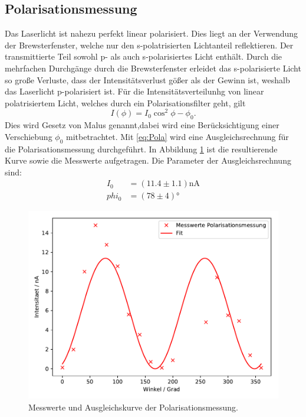 \subsection{Polarisationsmessung}
Das Laserlicht ist nahezu perfekt linear polarisiert. Dies liegt an der Verwendung der
Brewsterfenster, welche nur den s-polatrisierten Lichtanteil reflektieren. Der
transmittierte Teil sowohl p- als auch s-polarisiertes Licht enthält. Durch die
mehrfachen Durchgänge durch die Brewsterfenster erleidet das s-polarisierte Licht
so große Verluste, dass der Intensitätsverlust gößer als der Gewinn ist, weshalb
das Laserlicht p-polarisiert ist.
Für die Intensitätsverteilunhg von linear polatrisiertem Licht, welches durch ein
Polarisationsfilter geht, gilt
\begin{equation}
  I(\phi)=I_0 \cos^2{\phi-\phi_0} .
\end{equation}
Dies wird Gesetz von Malus genannt,dabei wird eine Berücksichtigung einer Verschiebung $\phi_0$
mitbetrachtet.
Mit \ref{eq:Pola} wird eine Ausgleichsrechnung für die Polarisationsmessung durchgeführt.
In Abbildung \ref{fig:Pola} ist die resultierende Kurve sowie die Messwerte aufgetragen.
Die Parameter der Ausgleichsrechnung sind:
\begin{align*}
  I_0&=(11.4 \pm 1.1)\text{nA} \\
  phi_0&=(78 \pm 4)°
\end{align*}
\begin{figure}[H]
  \centering
  \includegraphics{plots/Polarisation.pdf}
  \caption{Messwerte und Ausgleichskurve der Polarisationsmessung.}
  \label{fig:Pola}
\end{figure}
